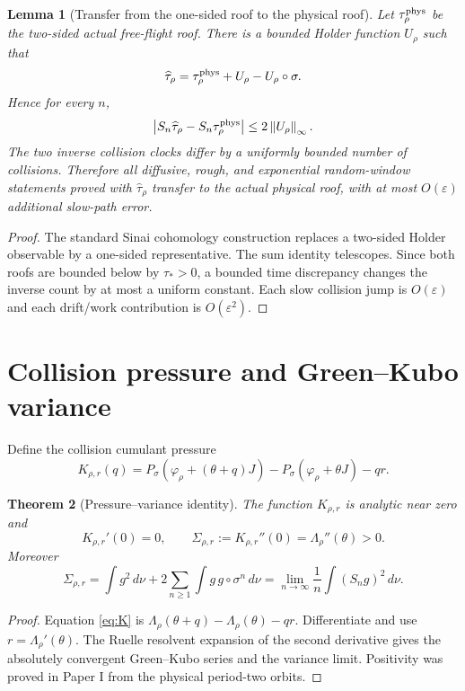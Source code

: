 \documentclass[11pt,reqno]{amsart}
\newtheorem{theorem}{Theorem}[section]
\newtheorem{lemma}[theorem]{Lemma}
\theoremstyle{definition}
\theoremstyle{remark}
\newcommand{\norm}[1]{\left\lVert #1\right\rVert}
\newcommand{\abs}[1]{\left\lvert #1\right\rvert}
\begin{document}
\begin{lemma}[Transfer from the one-sided roof to the physical roof]\label{lem:roof-cohomology}
Let $\tau^{\rm phys}_\rho$ be the two-sided actual free-flight roof.  There is
a bounded Holder function $U_\rho$ such that
\[
 \widehat\tau_\rho
 =\tau^{\rm phys}_\rho+U_\rho-U_\rho\circ\sigma.
\]
Hence for every $n$,
\[
 \abs{S_n\widehat\tau_\rho-S_n\tau^{\rm phys}_\rho}
 \le2\norm{U_\rho}_\infty.
\]
The two inverse collision clocks differ by a uniformly bounded number of
collisions.  Therefore all diffusive, rough, and exponential random-window
statements proved with $\widehat\tau_\rho$ transfer to the actual physical
roof, with at most $O(\varepsilon)$ additional slow-path error.
\end{lemma}
\begin{proof}
The standard Sinai cohomology construction replaces a two-sided Holder
observable by a one-sided representative.  The sum identity telescopes.  Since
both roofs are bounded below by $\tau_*>0$, a bounded time discrepancy changes
the inverse count by at most a uniform constant.  Each slow collision jump is
$O(\varepsilon)$ and each drift/work contribution is $O(\varepsilon^2)$.
\end{proof}

\section{Collision pressure and Green--Kubo variance}\label{sec:variance}
Define the collision cumulant pressure
\begin{equation}\label{eq:K}
 K_{\rho,r}(q)
 =P_\sigma(\varphi_\rho+(\theta+q)J)
 -P_\sigma(\varphi_\rho+\theta J)-qr.
\end{equation}

\begin{theorem}[Pressure--variance identity]\label{thm:variance}
The function $K_{\rho,r}$ is analytic near zero and
\[
 K_{\rho,r}'(0)=0,
 \qquad
 \Sigma_{\rho,r}:=K_{\rho,r}''(0)
 =\Lambda_\rho''(\theta)>0.
\]
Moreover
\[
 \Sigma_{\rho,r}
 =\int g^2\,d\nu
 +2\sum_{n\ge1}\int g\,g\circ\sigma^n\,d\nu
 =\lim_{n\to\infty}\frac1n
 \int(S_ng)^2\,d\nu.
\]
\end{theorem}
\begin{proof}
Equation \eqref{eq:K} is
$\Lambda_\rho(\theta+q)-\Lambda_\rho(\theta)-qr$.
Differentiate and use $r=\Lambda_\rho'(\theta)$.  The Ruelle resolvent
expansion of the second derivative gives the absolutely convergent
Green--Kubo series and the variance limit.  Positivity was proved in Paper I
from the physical period-two orbits.
\end{proof}
\end{document}
